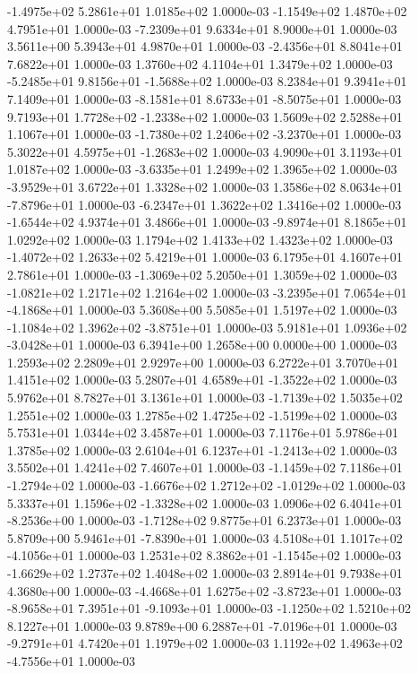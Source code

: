 -1.4975e+02  5.2861e+01  1.0185e+02  1.0000e-03
-1.1549e+02  1.4870e+02  4.7951e+01  1.0000e-03
-7.2309e+01  9.6334e+01  8.9000e+01  1.0000e-03
3.5611e+00 5.3943e+01 4.9870e+01  1.0000e-03
-2.4356e+01  8.8041e+01  7.6822e+01  1.0000e-03
1.3760e+02 4.1104e+01 1.3479e+02  1.0000e-03
-5.2485e+01  9.8156e+01 -1.5688e+02  1.0000e-03
8.2384e+01 9.3941e+01 7.1409e+01  1.0000e-03
-8.1581e+01  8.6733e+01 -8.5075e+01  1.0000e-03
 9.7193e+01  1.7728e+02 -1.2338e+02  1.0000e-03
1.5609e+02 2.5288e+01 1.1067e+01  1.0000e-03
-1.7380e+02  1.2406e+02 -3.2370e+01  1.0000e-03
 5.3022e+01  4.5975e+01 -1.2683e+02  1.0000e-03
4.9090e+01 3.1193e+01 1.0187e+02  1.0000e-03
-3.6335e+01  1.2499e+02  1.3965e+02  1.0000e-03
-3.9529e+01  3.6722e+01  1.3328e+02  1.0000e-03
 1.3586e+02  8.0634e+01 -7.8796e+01  1.0000e-03
-6.2347e+01  1.3622e+02  1.3416e+02  1.0000e-03
-1.6544e+02  4.9374e+01  3.4866e+01  1.0000e-03
-9.8974e+01  8.1865e+01  1.0292e+02  1.0000e-03
1.1794e+02 1.4133e+02 1.4323e+02  1.0000e-03
-1.4072e+02  1.2633e+02  5.4219e+01  1.0000e-03
6.1795e+01 4.1607e+01 2.7861e+01  1.0000e-03
-1.3069e+02  5.2050e+01  1.3059e+02  1.0000e-03
-1.0821e+02  1.2171e+02  1.2164e+02  1.0000e-03
-3.2395e+01  7.0654e+01 -4.1868e+01  1.0000e-03
5.3608e+00 5.5085e+01 1.5197e+02  1.0000e-03
-1.1084e+02  1.3962e+02 -3.8751e+01  1.0000e-03
 5.9181e+01  1.0936e+02 -3.0428e+01  1.0000e-03
6.3941e+00 1.2658e+00 0.0000e+00  1.0000e-03
1.2593e+02 2.2809e+01 2.9297e+00  1.0000e-03
6.2722e+01 3.7070e+01 1.4151e+02  1.0000e-03
 5.2807e+01  4.6589e+01 -1.3522e+02  1.0000e-03
5.9762e+01 8.7827e+01 3.1361e+01  1.0000e-03
-1.7139e+02  1.5035e+02  1.2551e+02  1.0000e-03
 1.2785e+02  1.4725e+02 -1.5199e+02  1.0000e-03
5.7531e+01 1.0344e+02 3.4587e+01  1.0000e-03
7.1176e+01 5.9786e+01 1.3785e+02  1.0000e-03
 2.6104e+01  6.1237e+01 -1.2413e+02  1.0000e-03
3.5502e+01 1.4241e+02 7.4607e+01  1.0000e-03
-1.1459e+02  7.1186e+01 -1.2794e+02  1.0000e-03
-1.6676e+02  1.2712e+02 -1.0129e+02  1.0000e-03
 5.3337e+01  1.1596e+02 -1.3328e+02  1.0000e-03
 1.0906e+02  6.4041e+01 -8.2536e+00  1.0000e-03
-1.7128e+02  9.8775e+01  6.2373e+01  1.0000e-03
 5.8709e+00  5.9461e+01 -7.8390e+01  1.0000e-03
 4.5108e+01  1.1017e+02 -4.1056e+01  1.0000e-03
 1.2531e+02  8.3862e+01 -1.1545e+02  1.0000e-03
-1.6629e+02  1.2737e+02  1.4048e+02  1.0000e-03
2.8914e+01 9.7938e+01 4.3680e+00  1.0000e-03
-4.4668e+01  1.6275e+02 -3.8723e+01  1.0000e-03
-8.9658e+01  7.3951e+01 -9.1093e+01  1.0000e-03
-1.1250e+02  1.5210e+02  8.1227e+01  1.0000e-03
 9.8789e+00  6.2887e+01 -7.0196e+01  1.0000e-03
-9.2791e+01  4.7420e+01  1.1979e+02  1.0000e-03
 1.1192e+02  1.4963e+02 -4.7556e+01  1.0000e-03
